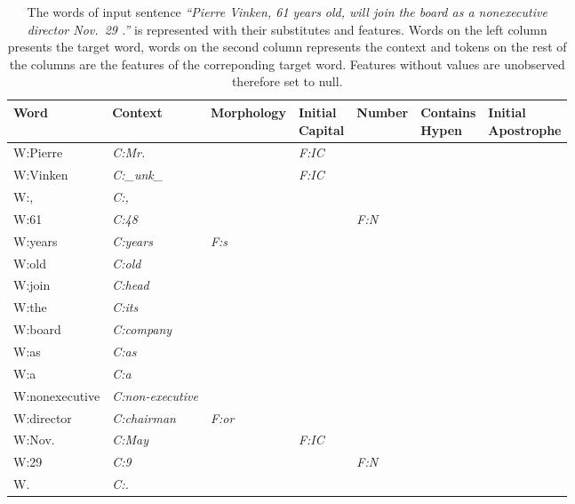 \begin{table}[ht]
\centering
\small
\caption{The words of input sentence \textit{``Pierre Vinken, 61 years old, 
    will join the board as a nonexecutive director Nov.~29 .''} is represented 
  with their substitutes and features.  Words on the left 
  column presents the
  target word, words on the second column represents the context and
  tokens on the rest of the columns are the features of the
  correponding target word.  Features without values are unobserved
  therefore set to null.}
\begin{tabular}{|lllllll|}
\hline
\textbf{Word} & {\bf Context} & {\bf Morphology} &
\specialcell{{\bf Initial}\\{\bf Capital}} & {\bf Number} &
\specialcell{{\bf Contains}\\{\bf Hypen}} &
\specialcell{{\bf Initial}\\{\bf Apostrophe}}
\\
\hline
W:Pierre & \textit{C:Mr.} & & {\it F:IC} &&&\\
W:Vinken & \textit{C:\_unk\_} & & {\it F:IC} &&&\\
W:, & \textit{C:,} & & &&&\\
W:61 & \textit{C:48} & & & {\it F:N}&&\\
W:years & \textit{C:years} & {\it F:s} &&&&\\
W:old & \textit{C:old} & & &&&\\
W:join & \textit{C:head} &&&&&\\
W:the & \textit{C:its} &&&&&\\
W:board & \textit{C:company} &&&&&\\
W:as & \textit{C:as} &&&&&\\
W:a & \textit{C:a} &&&&&\\
W:nonexecutive & \textit{C:non-executive} &&&&&\\
W:director & \textit{C:chairman} & {\it F:or}&&&&\\
W:Nov. & \textit{C:May} &&{\it F:IC}&&&\\
W:29 & \textit{C:9} &&&{\it F:N}&&\\
W. & \textit{C:.} & &&&&\\
\hline
\end{tabular}
\label{tab:sampleswithfeatures}
\end{table}


